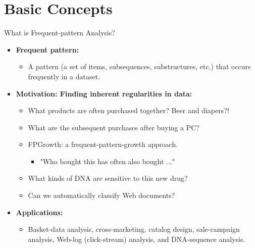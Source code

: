 \section{Basic Concepts}

\begin{frame}{What is Frequent-pattern Analysis?}
	\begin{itemize}
		\item \textbf{Frequent pattern:}
		\begin{itemize}
			\item A pattern (a set of items, subsequences, substructures, etc.) 
			that occurs frequently in a dataset.
		\end{itemize}
		\item \textbf{Motivation: Finding inherent regularities in data:}
		\begin{itemize}
			\item What products are often purchased together? Beer and diapers?!
			\item What are the subsequent purchases after buying a PC?
			\item FPGrowth: a frequent-pattern-growth approach.
			\begin{itemize}
				\item "Who bought this has often also bought $\ldots$"
			\end{itemize}
			\item What kinds of DNA are sensitive to this new drug?
			\item Can we automatically classify Web documents?
		\end{itemize}
		\item \textbf{Applications:}
		\begin{itemize}
			\item Basket-data analysis, cross-marketing, catalog design, 
			sale-campaign analysis, Web-log (click-stream) analysis, and 
			DNA-sequence analysis.
		\end{itemize}
	\end{itemize}
\end{frame}

